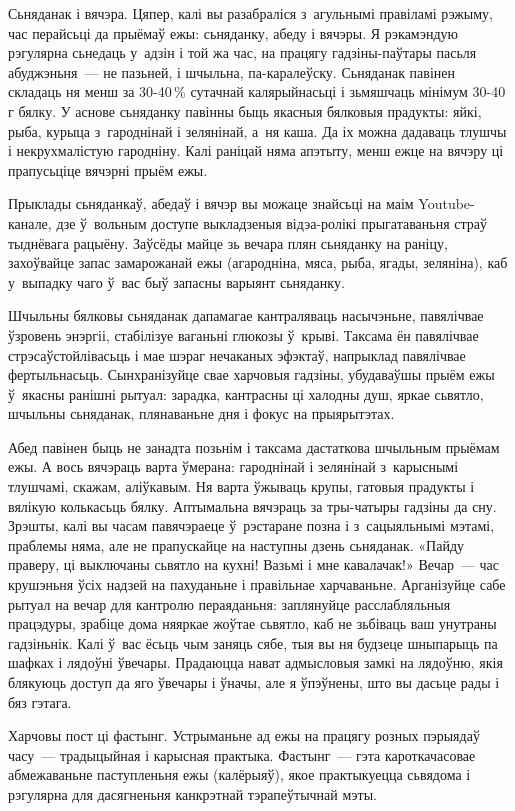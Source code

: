 Сьняданак і вячэра. Цяпер, калі вы разабраліся з~агульнымі правіламі рэжыму, час перайсьці да прыёмаў ежы: сьняданку, абеду і вячэры. Я рэкамэндую рэгулярна сьнедаць у~адзін і той жа час, на працягу гадзіны-паўтары пасьля абуджэньня~--- не пазьней, і шчыльна, па-каралеўску. Сьняданак павінен складаць ня менш за 30-40\,\% сутачнай калярыйнасьці і зьмяшчаць мінімум 30-40 г бялку. У аснове сьняданку павінны быць якасныя бялковыя прадукты: яйкі, рыба, курыца з~гароднінай і зелянінай, а~ня каша. Да іх можна дадаваць тлушчы і некрухмалістую гародніну. Калі раніцай няма апэтыту, менш ежце на вячэру ці прапусьціце вячэрні прыём ежы.

Прыклады сьняданкаў, абедаў і вячэр вы можаце знайсьці на маім Youtube-канале, дзе ў~вольным доступе выкладзеныя відэа-ролікі прыгатаваньня страў тыднёвага рацыёну. Заўсёды майце зь вечара плян сьняданку на раніцу, захоўвайце запас замарожанай ежы (агародніна, мяса, рыба, ягады, зеляніна), каб у~выпадку чаго ў~вас быў запасны варыянт сьняданку.

Шчыльны бялковы сьняданак дапамагае кантраляваць насычэньне, павялічвае ўзровень энэргіі, стабілізуе ваганьні глюкозы ў~крыві. Таксама ён павялічвае стрэсаўстойлівасьць і мае шэраг нечаканых эфэктаў, напрыклад павялічвае фертыльнасьць. Сынхранізуйце свае харчовыя гадзіны, убудаваўшы прыём ежы ў~якасны ранішні рытуал: зарадка, кантрасны ці халодны душ, яркае сьвятло, шчыльны сьняданак, плянаваньне дня і фокус на прыярытэтах.

Абед павінен быць не занадта позьнім і таксама дастаткова шчыльным прыёмам ежы. А вось вячэраць варта ўмерана: гароднінай і зелянінай з~карыснымі тлушчамі, скажам, аліўкавым. Ня варта ўжываць крупы, гатовыя прадукты і вялікую колькасьць бялку. Аптымальна вячэраць за тры-чатыры гадзіны да сну. Зрэшты, калі вы часам павячэраеце ў~рэстаране позна і з~сацыяльнымі мэтамі, праблемы няма, але не прапускайце на наступны дзень сьняданак. «Пайду праверу, ці выключаны сьвятло на кухні! Вазьмі і мне кавалачак!» Вечар~--- час крушэньня ўсіх надзей на пахуданьне і правільнае харчаваньне. Арганізуйце сабе рытуал на вечар для кантролю пераяданьня: заплянуйце расслабляльныя працэдуры, зрабіце дома няяркае жоўтае сьвятло, каб не зьбіваць ваш унутраны гадзіньнік. Калі ў~вас ёсьць чым заняць сябе, тыя вы ня будзеце шныпарыць па шафках і лядоўні ўвечары. Прадаюцца нават адмысловыя замкі на лядоўню, якія блякуюць доступ да яго ўвечары і ўначы, але я ўпэўнены, што вы дасьце рады і бяз гэтага.

Харчовы пост ці фастынг. Устрыманьне ад ежы на працягу розных пэрыядаў часу~--- традыцыйная і карысная практыка. Фастынг~--- гэта кароткачасовае абмежаваньне паступленьня ежы (калёрыяў), якое практыкуецца сьвядома і рэгулярна для дасягненьня канкрэтнай тэрапеўтычнай мэты.

